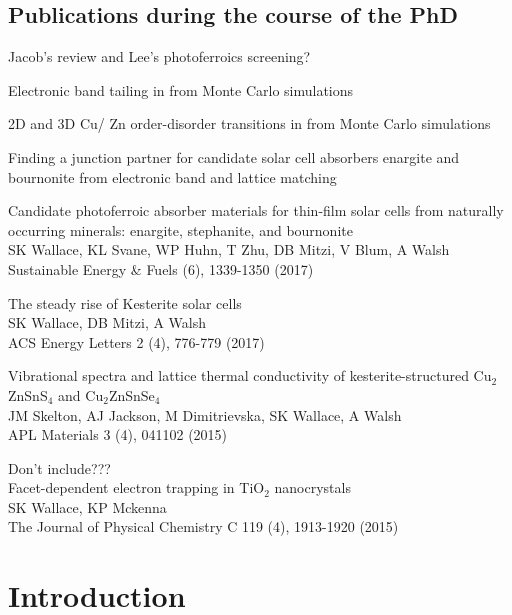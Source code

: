 \documentclass[11pt, twoside]{report}
\begin{document}
\section*{Publications during the course of the PhD}
\begin{etaremune}
\item Jacob's review and Lee's photoferroics screening?
\item Electronic band tailing in {\CZTS} from Monte Carlo simulations
\item 2D and 3D Cu/ Zn order-disorder transitions in {\CZTS} from Monte Carlo simulations
\item Finding a junction partner for candidate solar cell absorbers enargite and bournonite from electronic band and lattice matching
\item Candidate photoferroic absorber materials for thin-film solar cells from naturally occurring minerals: enargite, stephanite, and bournonite\\
SK Wallace, KL Svane, WP Huhn, T Zhu, DB Mitzi, V Blum, A Walsh\\ Sustainable Energy \& Fuels  (6), 1339-1350 (2017)
\item The steady rise of Kesterite solar cells\\ SK Wallace, DB Mitzi, A Walsh\\ ACS Energy Letters 2 (4), 776-779 (2017)
\item Vibrational spectra and lattice thermal conductivity of kesterite-structured Cu$_2$ZnSnS$_4$ and Cu$_2$ZnSnSe$_4$\\ JM Skelton, AJ Jackson, M Dimitrievska, SK Wallace, A Walsh\\ APL Materials 3 (4), 041102 (2015)
\item Don't include???\\ Facet-dependent electron trapping in TiO$_2$ nanocrystals\\ SK Wallace, KP Mckenna\\ The Journal of Physical Chemistry C 119 (4), 1913-1920 (2015)
\end{etaremune}


\tableofcontents
{}
\listoffigures
{}
\listoftables
{}



\chapter{Introduction}
\setcounter{page}{1}
\end{document}

